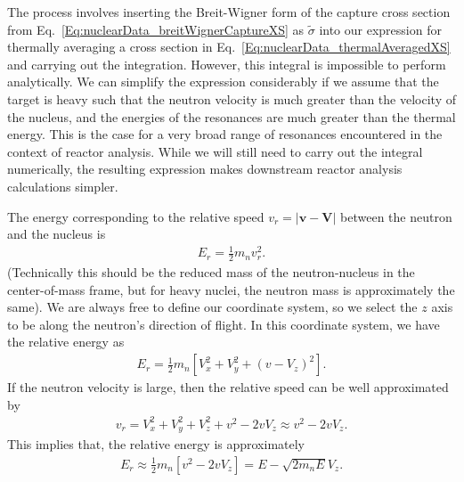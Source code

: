 The process involves inserting the Breit-Wigner form of the capture cross section from Eq.~\eqref{Eq:nuclearData_breitWignerCaptureXS} as $\tilde{\sigma}$ into our expression for thermally averaging a cross section in Eq.~\eqref{Eq:nuclearData_thermalAveragedXS} and carrying out the integration. However, this integral is impossible to perform analytically. We can simplify the expression considerably if we assume that the target is heavy such that the neutron velocity is much greater than the velocity of the nucleus, and the energies of the resonances are much greater than the thermal energy. This is the case for a very broad range of resonances encountered in the context of reactor analysis. While we will still need to carry out the integral numerically, the resulting expression makes downstream reactor analysis calculations simpler.

The energy corresponding to the relative speed $v_r = | \mathbf{v} - \mathbf{V} |$ between the neutron and the nucleus is
\begin{align}
  E_r = \frac{1}{2} m_n v_r^2 . \nonumber
\end{align}
(Technically this should be the reduced mass of the neutron-nucleus in the center-of-mass frame, but for heavy nuclei, the neutron mass is approximately the same). We are always free to define our coordinate system, so we select the $z$ axis to be along the neutron's direction of flight. In this coordinate system, we have the relative energy as
\begin{align}
  E_r = \frac{1}{2} m_n [ V_x^2 + V_y^2 + ( v - V_z )^2 ] . 
\end{align}
If the neutron velocity is large, then the relative speed can be well approximated by
\begin{align}
  v_r = V_x^2 + V_y^2 + V_z^2 + v^2 - 2 v V_z \approx v^2 - 2 v V_z.
\end{align}
This implies that, the relative energy is approximately
\begin{align}
  E_r \approx \frac{1}{2} m_n [ v^2 - 2 v V_z ] = E - \sqrt{ 2 m_n E } V_z . 
\end{align}

